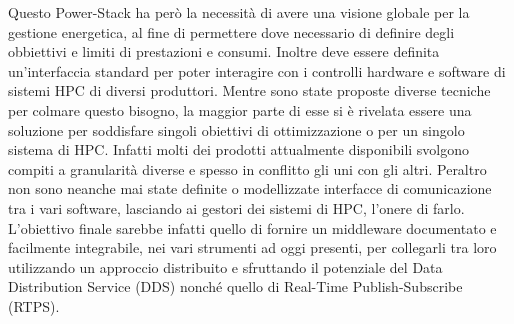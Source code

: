 Questo Power-Stack ha però la necessità di avere una visione globale per la gestione energetica, al fine di permettere dove necessario di definire degli obbiettivi e limiti di prestazioni e consumi. Inoltre deve essere definita un'interfaccia standard per poter interagire con i controlli hardware e software di sistemi HPC di diversi produttori.
Mentre sono state proposte diverse tecniche per colmare questo bisogno, %
la maggior parte di esse si è rivelata essere una soluzione per soddisfare singoli obiettivi di ottimizzazione o per un singolo sistema di HPC. Infatti molti dei prodotti attualmente disponibili svolgono compiti a granularità diverse e spesso in conflitto gli uni con gli altri. Peraltro non sono neanche mai state definite o modellizzate interfacce di comunicazione tra i vari software, lasciando ai gestori dei sistemi di HPC, l'onere di farlo.
L'obiettivo finale sarebbe infatti quello di fornire un middleware documentato e facilmente integrabile, nei vari strumenti ad oggi presenti, per collegarli tra loro utilizzando un approccio distribuito e sfruttando il potenziale del Data Distribution Service (DDS)%
nonché quello di Real-Time Publish-Subscribe (RTPS).


